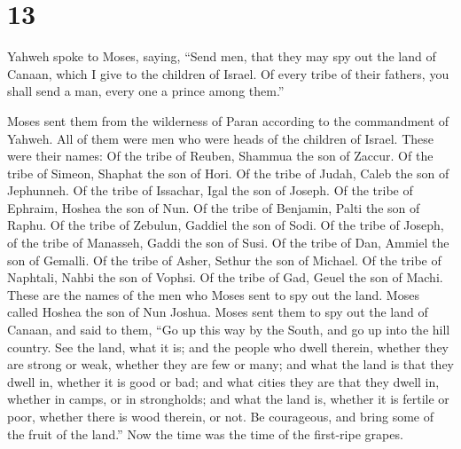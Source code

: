 \hypertarget{section-12}{%
\section{13}\label{section-12}}

 Yahweh spoke to Moses, saying,  ``Send men,
that they may spy out the land of Canaan, which I give to the children
of Israel. Of every tribe of their fathers, you shall send a man, every
one a prince among them.''

 Moses sent them from the wilderness of Paran according to
the commandment of Yahweh. All of them were men who were heads of the
children of Israel.  These were their names: Of the tribe of
Reuben, Shammua the son of Zaccur.  Of the tribe of Simeon,
Shaphat the son of Hori.  Of the tribe of Judah, Caleb the
son of Jephunneh.  Of the tribe of Issachar, Igal the son of
Joseph.  Of the tribe of Ephraim, Hoshea the son of Nun.
 Of the tribe of Benjamin, Palti the son of Raphu.
 Of the tribe of Zebulun, Gaddiel the son of Sodi.
 Of the tribe of Joseph, of the tribe of Manasseh, Gaddi
the son of Susi.  Of the tribe of Dan, Ammiel the son of
Gemalli.  Of the tribe of Asher, Sethur the son of Michael.
 Of the tribe of Naphtali, Nahbi the son of Vophsi.
 Of the tribe of Gad, Geuel the son of Machi. 
These are the names of the men who Moses sent to spy out the land. Moses
called Hoshea the son of Nun Joshua.  Moses sent them to
spy out the land of Canaan, and said to them, ``Go up this way by the
South, and go up into the hill country.  See the land, what
it is; and the people who dwell therein, whether they are strong or
weak, whether they are few or many;  and what the land is
that they dwell in, whether it is good or bad; and what cities they are
that they dwell in, whether in camps, or in strongholds; 
and what the land is, whether it is fertile or poor, whether there is
wood therein, or not. Be courageous, and bring some of the fruit of the
land.'' Now the time was the time of the first-ripe grapes.

